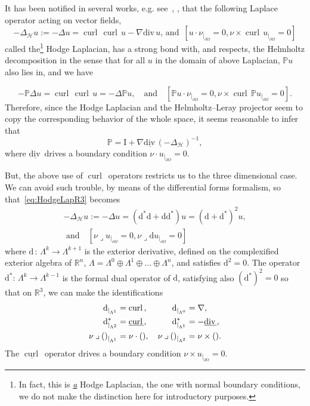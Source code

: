 \documentclass[AHL,Unicode,longabstracts,published]{cedram}
\renewcommand*{\div}{\mathrm{div\,}}
\DeclareMathOperator{\curl}{curl\,}
\newcommand{\bbP}{\mathbb{P}}
\newcommand{\bbR}{\mathbb{R}}
\newcommand{\rmd}{\mathrm{d}}
\newcommand{\rmI}{\mathrm{I}}
\newcommand{\clH}{\mathcal{H}}
\newcommand{\iprod}{\mathbin{\lrcorner}}
\begin{document}
It has been notified in several works, e.g. see~\cite[Introduction]{GeissertHeckTrunk2013}, \cite[Section~4]{MonniauxShen2018}, that the following Laplace operator acting on vector fields,
\begin{equation}\label{eq:HodgeLapR3}
-\Delta_{\clH}u:=-\Delta u = \curl \curl u - \nabla \div u \text{, and }\, \left[u\cdot\nu_{|_{\partial\Omega}} = 0, \nu\times\curl u_{|_{\partial\Omega}} = 0\right]
\end{equation}
called the\footnote{In fact, this is \underline{\emph{a}} Hodge Laplacian, the one with normal boundary conditions, we do not make the distinction here for introductory purposes.} Hodge Laplacian, has a strong bond with, and respects, the Helmholtz decomposition in the sense that for all $u$ in the domain of above Laplacian, $\bbP u$ also lies in, and we have

\[
-\bbP\Delta u = \curl \curl u = -\Delta \bbP u,\quad\text{and}\quad \left[\bbP u\cdot\nu_{|_{\partial\Omega}} = 0,  \nu\times\curl \bbP u_{|_{\partial\Omega}} = 0\right].
\]
Therefore, since the Hodge Laplacian and the Helmholtz--Leray projector seem to copy the corresponding behavior of the whole space, it seems reasonable to infer that
\begin{equation}\label{eq:HodgeHelmotzLerayProj1}
\bbP = \rmI  +\nabla\underline{\div}
(-\Delta_{\clH})^{-1},
\end{equation}
where $\underline{\div}$ drives a boundary condition $\nu \cdot u_{|_{\partial\Omega}} =0$.

But, the above use of $\curl$ operators restricts us to the three dimensional case. We can avoid such trouble, by means of the differential forms formalism, so that~\eqref{eq:HodgeLapR3} becomes
\begin{multline}\label{eq:HodgeLapdefIntro}
-\Delta_{\clH}u:=-\Delta u = \left(\rmd^\ast \rmd + \rmd \rmd^\ast\right) u = \left(\rmd+\rmd^\ast\right)^2 u,\\
 \text{ and}\quad \left[\nu\iprod u_{|_{\partial\Omega}} = 0, \nu\iprod \rmd u_{|_{\partial\Omega}} = 0\right]
\end{multline}
where $\rmd\,:\,\Lambda^{k}\longrightarrow\Lambda^{k+1}$ is the exterior derivative, defined on the complexified exterior algebra of $\bbR^n$, $\Lambda = \Lambda^0 \oplus \Lambda^1 \oplus \ldots \oplus \Lambda^n$, and satisfies $\rmd^2=0$. The operator $\rmd^\ast:\,\Lambda^{k}\longrightarrow\Lambda^{k-1}$ is the formal dual operator of $\rmd$, satisfying also $(\rmd^\ast)^2=0$ so that on $\bbR^3$, we can make the identifications
\begin{align*}
\rmd_{|_{\Lambda^{1}}} &= \curl, \mkern53mu\rmd_{|_{\Lambda^{0}}} = \nabla,\\
\rmd^{\ast}_{|_{\Lambda^{2}}} &= \underline{\curl}, \mkern53mu \rmd^\ast_{|_{\Lambda^{1}}} = -\underline{\div},\\
\nu\iprod ()_{|_{\Lambda^{1}}} &= \nu \cdot (),   \quad \nu\iprod ()_{|_{\Lambda^{2}}} = \nu\times () .
\end{align*}
The $\underline{\curl}$ operator drives a boundary condition $\nu\times
u_{|_{\partial\Omega}}=0$.
\end{document}
